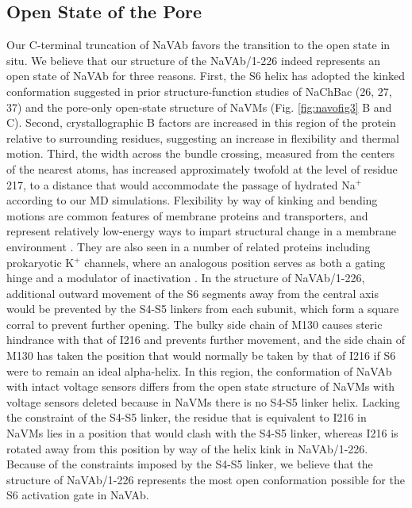 \begin{refsection}
{\subsection{Open State of the Pore}
Our C-terminal truncation of NaVAb favors the transition to the open state in situ. We believe that our structure of the NaVAb/1-226 indeed represents an open state of NaVAb for three reasons. First, the S6 helix has adopted the kinked conformation suggested in prior structure-function studies of NaChBac (26, 27, 37) \cite{Zhao:2004vo} and the pore-only open-state structure of NaVMs \cite{McCusker:2012di} (Fig. \ref{fig:navofig3} B and C). Second, crystallographic B factors are increased in this region of the protein relative to surrounding residues, suggesting an increase in flexibility and thermal motion. Third, the width across the bundle crossing, measured from the centers of the nearest atoms, has increased approximately twofold at the level of residue 217, to a distance that would accommodate the passage of hydrated Na$^+$ according to our MD simulations. Flexibility by way of kinking and bending motions are common features of membrane proteins and transporters, and represent relatively low-energy ways to impart structural change in a membrane environment \cite{Wilman:2014fk}. They are also seen in a number of related proteins including prokaryotic K$^+$ channels, where an analogous position serves as both a gating hinge and a modulator of inactivation \cite{Cuello:2010kf,Jiang:2002fx,Zhou:2001vo}.
In the structure of NaVAb/1-226, additional outward movement of the S6 segments away from the central axis would be prevented by the S4-S5 linkers from each subunit, which form a square corral to prevent further opening. The bulky side chain of M130 causes steric hindrance with that of I216 and prevents further movement, and the side chain of M130 has taken the position that would normally be taken by that of I216 if S6 were to remain an ideal alpha-helix. In this region, the conformation of NaVAb with intact voltage sensors differs from the open state structure of NaVMs with voltage sensors deleted because in NaVMs there is no S4-S5 linker helix. Lacking the constraint of the S4-S5 linker, the residue that is equivalent to I216 in NaVMs lies in a position that would clash with the S4-S5 linker, whereas I216 is rotated away from this position by way of the helix kink in NaVAb/1-226. Because of the constraints imposed by the S4-S5 linker, we believe that the structure of NaVAb/1-226 represents the most open conformation possible for the S6 activation gate in NaVAb.

}
\end{refsection}
